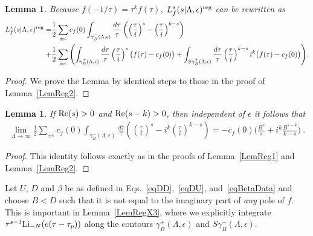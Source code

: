 \documentclass[11pt,a4paper]{article}
\newcommand{\g}{\gamma}
\newcommand{\e}{\epsilon}
\newcommand{\La}{\Lambda}
\newtheorem{lem}[thm]{Lemma}
\newcommand{\reg}{{\rm reg}}
\begin{document}
\begin{lem}
\label{LemReg8}
Because $f(-1/\tau) = \tau^k f(\tau)$, $L_f^*(s|\La,\e)^\reg$ can be rewritten as
\begin{align}
L_f^*(s|\La,\e)^\reg
=& 
\frac12\sum_{\pm \e} c_f(0) \int_{\g_B^{-}(\La,\e)} \frac{d\tau}{\tau} \left( \left( \frac{\tau}{i} \right)^{s} - \left(\frac{\tau}{i} \right)^{k-s} \right) \label{eqLemReg8a}
\\ \nonumber
+&
\frac12\sum_{\pm \e} \left( \int_{\g_B^{+}(\La,\e)} \frac{d\tau}{\tau} \left( \frac{\tau}{i} \right)^{s} \big( f(\tau) -c_f(0) \big) + \int_{S\g_B^{+}(\La,\e)} \frac{d\tau}{\tau} \left( \frac{\tau}{i} \right)^{k-s} i^k\big( f(\tau) -c_f(0) \big) \right)\!.
\end{align}
\end{lem}

\begin{proof}
We prove the Lemma by identical steps to those in the proof of Lemma~\ref{LemReg2}.
\end{proof}

\begin{lem}
\label{LemReg9}
If ${\rm Re}(s) > 0$ and ${\rm Re}(s-k) > 0$, then independent of $\e$ it follows that
\begin{align}
\label{eqLemReg9}
\lim_{\La \to \infty} \frac12\sum_{\pm \e} c_f(0) \int_{\g_B^{-}(\La,\e)} \frac{d\tau}{\tau} \left( \left( \frac{\tau}{i} \right)^{s} - i^k \left(\frac{\tau}{i} \right)^{k-s} \right) =-c_f(0) \bigg(  \frac{B^s}{s} + i^k\frac{B^{s-k}}{k-s} \bigg)~.
\end{align}
\end{lem}
\begin{proof}
This identity follows exactly as in the proofs of Lemma~\ref{LemReg1} and Lemma~\ref{LemReg2}.
\end{proof}
Let $U$, $D$ and $\beta$ be as defined in Eqs.~\eqref{eqDD},~\eqref{eqDU}, and~\eqref{eqBetaData} and choose $B<D$ such that it is not equal to the imaginary part of {\em any} pole of $f$. This is important in Lemma~\ref{LemRegX3}, where we explicitly integrate $\tau^{s-1} {\rm Li}_{-N}(e(\tau-\tau_p))$ along the contours $\g_B^+(\La,\e)$ and $S\g_B^-(\La,\e)$.
\end{document}
